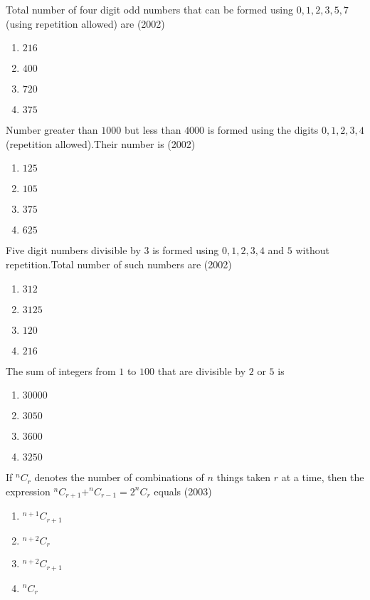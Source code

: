 \iffalse
\title{Assignment}
\author{Banapuram Pranay Kumar}
\section{mains}
\fi



\item Total number of four digit odd numbers that can be formed using $0,1,2,3,5,7$(using repetition allowed) are 
\hfill(2002)
\begin{enumerate}

    \item $216$
    
    \item $400$
    \item $720$
    \item $375$\\
\end{enumerate}

\item Number greater than $1000$ but less than $4000$ is  formed using the digits $0,1,2,3,4$(repetition allowed).Their number is
\hfill(2002)\\
\begin{enumerate}
    \item $125$
    \item $105$
    \item $375$
    \item $625$
\end{enumerate}

\item Five digit numbers divisible by $3$ is formed using $0,1,2,3,4$ and $5$ without repetition.Total number of such numbers are
\hfill(2002)
\begin{enumerate}
    \item $312$
    \item $3125$
    \item $120$
    \item $216$ \\
\end{enumerate}
\item The sum of integers from $1$ to $100$ that are divisible by $2$ or $5$ is
\hfill {}
\begin{enumerate}
    \item $30000$
    \item $3050$
    \item $3600$
    \item $3250$ 
\end{enumerate}

\item If $^nC_r$ denotes the number of combinations of $n$ things taken $r$ at a time, then the expression $^nC_{r+1} + ^nC_{r-1} = 2  ^nC_r$ equals
\hfill(2003)
\begin{enumerate}
    \item$^{n+1}C_{r+1}$
    \item$^{n+2}C_r$
    \item$^{n+2}C_{r+1}$
    \item$^nC_r$\\
\end{enumerate}



